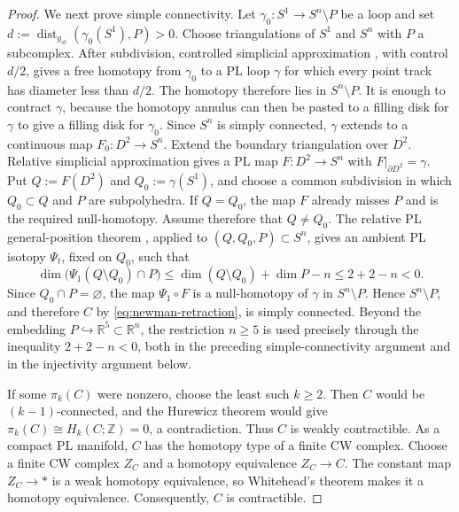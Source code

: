 \documentclass[12pt,oneside,a4paper]{article}
\theoremstyle{mytheorem}
\theoremstyle{remark}
\theoremstyle{definition}
\begin{document}
\begin{proof}
We next prove simple connectivity.  Let
$\gamma_0:S^1\to S^n\setminus P$ be a loop and set
$d:=\operatorname{dist}_{g_{st}}(\gamma_0(S^1),P)>0$.  Choose
triangulations of $S^1$ and $S^n$ with $P$ a subcomplex.  After
subdivision, controlled simplicial approximation
\cite[p.~222]{zbMATH01714503}, with control $d/2$, gives a free homotopy
from $\gamma_0$ to a PL loop $\gamma$ for which every point track has
diameter less than $d/2$.  The homotopy therefore lies in
$S^n\setminus P$.  It is enough to contract $\gamma$, because the
homotopy annulus can then be pasted to a filling disk for $\gamma$ to
give a filling disk for $\gamma_0$.  Since $S^n$ is simply connected,
$\gamma$ extends to a continuous map $F_0:D^2\to S^n$.  Extend the
boundary triangulation over $D^2$.  Relative simplicial approximation
\cite{zbMATH03195022} gives a PL map
$F:D^2\to S^n$ with $F|_{\partial D^2}=\gamma$.  Put
$Q:=F(D^2)$ and $Q_0:=\gamma(S^1)$, and choose a common subdivision in
which $Q_0\subset Q$ and $P$ are subpolyhedra.  If $Q=Q_0$, the
map $F$ already misses $P$ and is the required null-homotopy.  Assume
therefore that $Q\ne Q_0$.  The relative PL general-position theorem
\cite[Theorem~4.2]{zbMATH01714503}, applied to
$(Q,Q_0,P)\subset S^n$, gives an ambient PL isotopy $\Psi_t$, fixed on
$Q_0$, such that
\[
 \dim\bigl(\Psi_1(Q\setminus Q_0)\cap P\bigr)
 \leq \dim(Q\setminus Q_0)+\dim P-n
 \leq 2+2-n<0.
\]
Since $Q_0\cap P=\varnothing$, the map $\Psi_1\circ F$ is a null-homotopy
of $\gamma$ in $S^n\setminus P$.  Hence $S^n\setminus P$, and therefore
$C$ by \eqref{eq:newman-retraction}, is simply connected.  Beyond the
embedding $P\hookrightarrow\mathbb R^5\subset\mathbb R^n$, the restriction
$n\geq5$ is used precisely through the inequality $2+2-n<0$, both in
the preceding simple-connectivity argument and in the injectivity argument
below.

If some $\pi_k(C)$ were nonzero, choose the least such $k\geq2$.
Then $C$ would be $(k-1)$-connected, and the Hurewicz theorem
\cite[Theorem~4.32]{zbMATH02103273} would give
$\pi_k(C)\cong H_k(C;\mathbb Z)=0$, a contradiction.  Thus $C$ is
weakly contractible.  As a compact PL manifold, $C$ has the homotopy
type of a finite CW complex.  Choose a finite CW complex \(Z_C\) and a
homotopy equivalence $Z_C\to C$.  The constant map $Z_C\to *$ is a weak
homotopy equivalence, so Whitehead's theorem
\cite[Theorem~4.5]{zbMATH02103273} makes it a homotopy equivalence.
Consequently, $C$ is contractible.


\end{proof}
\end{document}
